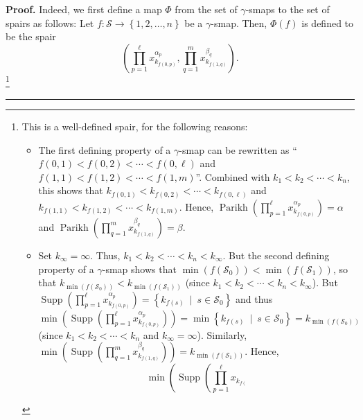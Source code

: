 \documentclass[numbers=enddot,12pt,final,onecolumn,notitlepage,abstracton]{scrartcl}%
\theoremstyle{definition}
\newenvironment{proof}[1][Proof]{\noindent\textbf{#1.} }{\ \rule{0.5em}{0.5em}}
\newenvironment{verlong}{}{}
\let\prodnonlimits\prod
\renewcommand{\prod}{\prodnonlimits\limits}
\begin{document}
\begin{proof}
\begin{verlong}
Indeed, we first define a map $\Phi$ from the set of $\gamma$-smaps to the set
of spairs as follows: Let $f:\mathcal{S}\rightarrow\left\{  1,2,\ldots
,n\right\}  $ be a $\gamma$-smap. Then, $\Phi\left(  f\right)  $ is defined to
be the spair%
\[
\left(  \prod_{p=1}^{\ell}x_{k_{f\left(  0,p\right)  }}^{\alpha_{p}}%
,\prod_{q=1}^{m}x_{k_{f\left(  1,q\right)  }}^{\beta_{q}}\right)  .
\]
\footnote{This is a well-defined spair, for the following reasons:
\par
\begin{itemize}
\item The first defining property of a $\gamma$-smap can be rewritten as
\textquotedblleft$f\left(  0,1\right)  <f\left(  0,2\right)  <\cdots<f\left(
0,\ell\right)  $ and $f\left(  1,1\right)  <f\left(  1,2\right)
<\cdots<f\left(  1,m\right)  $\textquotedblright. Combined with $k_{1}%
<k_{2}<\cdots<k_{n}$, this shows that $k_{f\left(  0,1\right)  }<k_{f\left(
0,2\right)  }<\cdots<k_{f\left(  0,\ell\right)  }$ and $k_{f\left(
1,1\right)  }<k_{f\left(  1,2\right)  }<\cdots<k_{f\left(  1,m\right)  }$.
Hence, $\operatorname*{Parikh}\left(  \prod_{p=1}^{\ell}x_{k_{f\left(
0,p\right)  }}^{\alpha_{p}}\right)  =\alpha$ and $\operatorname*{Parikh}%
\left(  \prod_{q=1}^{m}x_{k_{f\left(  1,q\right)  }}^{\beta_{q}}\right)
=\beta$.
\par
\item Set $k_{\infty}=\infty$. Thus, $k_{1}<k_{2}<\cdots<k_{n}<k_{\infty}$.
But the second defining property of a $\gamma$-smap shows that $\min\left(
f\left(  \mathcal{S}_{0}\right)  \right)  <\min\left(  f\left(  \mathcal{S}%
_{1}\right)  \right)  $, so that $k_{\min\left(  f\left(  \mathcal{S}%
_{0}\right)  \right)  }<k_{\min\left(  f\left(  \mathcal{S}_{1}\right)
\right)  }$ (since $k_{1}<k_{2}<\cdots<k_{n}<k_{\infty}$). But
$\operatorname*{Supp}\left(  \prod_{p=1}^{\ell}x_{k_{f\left(  0,p\right)  }%
}^{\alpha_{p}}\right)  =\left\{  k_{f\left(  s\right)  }\ \mid\ s\in
\mathcal{S}_{0}\right\}  $ and thus $\min\left(  \operatorname*{Supp}\left(
\prod_{p=1}^{\ell}x_{k_{f\left(  0,p\right)  }}^{\alpha_{p}}\right)  \right)
=\min\left\{  k_{f\left(  s\right)  }\ \mid\ s\in\mathcal{S}_{0}\right\}
=k_{\min\left(  f\left(  \mathcal{S}_{0}\right)  \right)  }$ (since
$k_{1}<k_{2}<\cdots<k_{n}$ and $k_{\infty}=\infty$). Similarly, $\min\left(
\operatorname*{Supp}\left(  \prod_{q=1}^{m}x_{k_{f\left(  1,q\right)  }%
}^{\beta_{q}}\right)  \right)  =k_{\min\left(  f\left(  \mathcal{S}%
_{1}\right)  \right)  }$. Hence,%
\[
\min\left(  \operatorname*{Supp}\left(  \prod_{p=1}^{\ell}x_{k_{f\left(
}}\]
\end{itemize}}
\end{verlong}
\end{proof}
\end{document}
